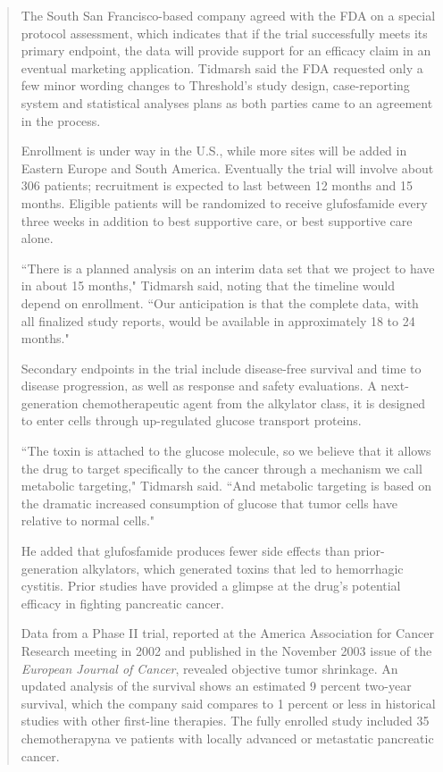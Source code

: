 \begin{singlespace}
\begin{small}
\begin{quotation}
The South San Francisco-based company agreed with the FDA on a special protocol assessment, which indicates that if the trial successfully meets its primary endpoint, the data will provide support for an efficacy claim in an eventual marketing application. Tidmarsh said the FDA requested only a few minor wording changes to Threshold's study design, case-reporting system and statistical analyses plans as both parties came to an agreement in the process.

Enrollment is under way in the U.S., while more sites will be added in Eastern Europe and South America. Eventually the trial will involve about 306 patients; recruitment is expected to last between 12 months and 15 months. Eligible patients will be randomized to receive glufosfamide every three weeks in addition to best supportive care, or best supportive care alone.

``There is a planned analysis on an interim data set that we project to have in about 15 months," Tidmarsh said, noting that the timeline would depend on enrollment. ``Our anticipation is that the complete data, with all finalized study reports, would be available in approximately 18 to 24 months."

Secondary endpoints in the trial include disease-free survival and time to disease progression, as well as response and safety evaluations. A next-generation chemotherapeutic agent from the alkylator class, it is designed to enter cells through up-regulated glucose transport proteins.

``The toxin is attached to the glucose molecule, so we believe that it allows the drug to target specifically to the cancer through a mechanism we call metabolic targeting," Tidmarsh said. ``And metabolic targeting is based on the dramatic increased consumption of glucose that tumor cells have relative to normal cells."

He added that glufosfamide produces fewer side effects than prior-generation alkylators, which generated toxins that led to hemorrhagic cystitis. Prior studies have provided a glimpse at the drug's potential efficacy in fighting pancreatic cancer.

Data from a Phase II trial, reported at the America Association for Cancer Research meeting in 2002 and published in the November 2003 issue of the \emph{European Journal of Cancer}, revealed objective tumor shrinkage. An updated analysis of the survival shows an estimated 9 percent two-year survival, which the company said compares to 1 percent or less in historical studies with other first-line therapies. The fully enrolled study included 35 chemotherapyna ve patients with locally advanced or metastatic pancreatic cancer.  


\end{quotation}
\end{small}
\end{singlespace}
